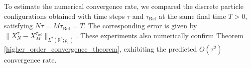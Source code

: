 \documentclass[11pt,a4paper]{amsart}
\newcommand{\1}{\mathds{1}}
\numberwithin{equation}{section}
\begin{document}
To estimate the numerical convergence rate, we compared the discrete particle configurations obtained with time steps $\tau$ and $\tau_{\mathrm{Ref}}$ at the same final time $T>0$, satisfying $N\tau = M\tau_{\mathrm{Ref}} = T$. 
The corresponding error is given by $\| X^{\tau}_{N} - X^{\tau_{\mathrm{ref}}}_{M} \|_{L^2(\mathbb{R}^d;\rho_0)}.$ These experiments also numerically confirm Theorem \ref{higher_order_convergence_theorem}, exhibiting the predicted $O(\tau^2)$ convergence rate.






\end{document}
